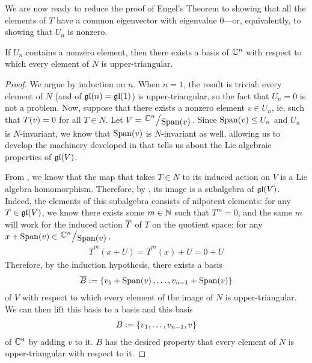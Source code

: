 We are now ready to reduce the proof of Engel's Theorem to showing that all the elements of $T$ have a common eigenvector with eigenvalue $0$---or, equivalently, to showing that $U_n$ is nonzero.

\begin{boxlemma}
    If $U_n$ contains a nonzero element, then there exists a basis of $\mathbb{C}^n$ with respect to which every element of $N$ is upper-triangular.
\end{boxlemma}
\begin{proof}
    We argue by induction on $n$. When $n = 1$, the result is trivial: every element of $N$ (and of $\mathfrak{gl}\!\left( n \right) = \mathfrak{gl}\!\left( 1 \right)$) is upper-triangular, so the fact that $U_n = 0$ is not a problem. Now, suppose that there exists a nonzero element $v \in U_n$, ie, such that $T\!\left( v \right) = 0$ for all $T \in N$. Let $V = \quotient{\C^n}{\Span{v}}$. Since $\operatorname{Span}\!\left( v \right) \leq U_n$ and $U_n$ is $N$-invariant, we know that $\operatorname{Span}\!\left( v \right)$ is $N$-invariant as well, allowing us to develop the machinery developed in  that tells us about the Lie algebraic properties of $\mathfrak{gl}\!\left( V \right)$.
    
    From , we know that the map that takes $T \in N$ to its induced action on $V$ is a Lie algebra homomorphism. Therefore, by , its image is a subalgebra of $\mathfrak{gl}\!\left( V \right)$. Indeed, the elements of this subalgebra consists of nilpotent elements: for any $T \in \mathfrak{gl}\!\left( V \right)$, we know there exists some $m \in \mathbb{N}$ such that $T^m = 0$, and the same $m$ will work for the induced action $\overline{T}$ of $T$ on the quotient space: for any $x + \Span{v} \in \quotient{\C^n}{\Span{v}}$,
    \begin{align*}
        \overline{T}^m(x + U) = \overline{T}^m(x) + U = 0 + U
    \end{align*}
    Therefore, by the induction hypothesis, there exists a basis
    \begin{align*}
        \overline{B} := \left\{ v_1 + \operatorname{Span}\!\left( v \right), \ldots, v_{n - 1} + \operatorname{Span}\!\left( v \right) \right\}
    \end{align*}
    of $V$ with respect to which every element of the image of $N$ is upper-triangular. We can then lift this basis to a basis and this basis
    \begin{align*}
        B := \left\{ v_1, \ldots, v_{n - 1}, v \right\}
    \end{align*}
    of $\mathbb{C}^n$ by adding $v$ to it. $B$ has the desired property that every element of $N$ is upper-triangular with respect to it.
\end{proof}

